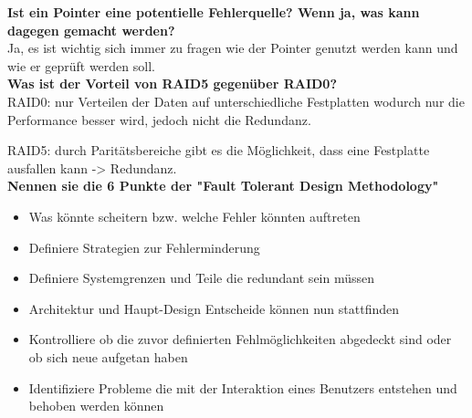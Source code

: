 \textbf{Ist ein Pointer eine potentielle Fehlerquelle? Wenn ja, was kann dagegen gemacht werden?}\\
Ja, es ist wichtig sich immer zu fragen wie der Pointer genutzt werden kann und wie er geprüft werden soll. \\

\textbf{Was ist der Vorteil von RAID5 gegenüber RAID0?}\\
RAID0: nur Verteilen der Daten auf unterschiedliche Festplatten wodurch nur die Performance besser wird, jedoch nicht die Redundanz.

RAID5: durch Paritätsbereiche gibt es die Möglichkeit, dass eine Festplatte ausfallen kann -> Redundanz. \\

\textbf{Nennen sie die 6 Punkte der "Fault Tolerant Design Methodology"}
\begin{itemize}
	\item Was könnte scheitern bzw. welche Fehler könnten auftreten
	\item Definiere Strategien zur Fehlerminderung
	\item Definiere Systemgrenzen und Teile die redundant sein müssen
	\item Architektur und Haupt-Design Entscheide können nun stattfinden
    \item Kontrolliere ob die zuvor definierten Fehlmöglichkeiten abgedeckt sind oder ob sich neue aufgetan haben
    \item Identifiziere Probleme die mit der Interaktion eines Benutzers entstehen und behoben werden können
\end{itemize}